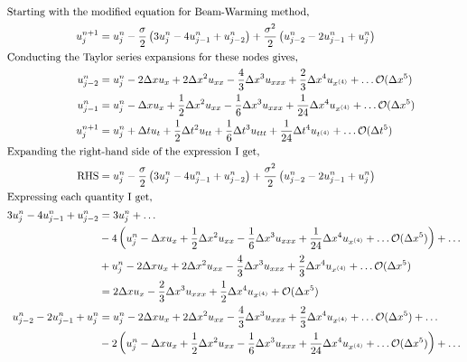 \begin{enumerate}[label=\alph*., start = 1]
    \vspace{-0.35in}
    \begin{align*}
        \shortintertext{Starting with the modified equation for Beam-Warming method,}
        u_j^{n+1} & = u_j^n - \frac{\sigma}{2}\left(3u_j^n - 4u_{j-1}^n + u_{j-2}^n\right) + \frac{\sigma^2}{2}\left(u_{j-2}^n - 2u_{j-1}^n + u_j^n\right)\\
        \shortintertext{Conducting the Taylor series expansions for these nodes gives,}
        u_{j-2}^n & = u_j^n - 2\Delta xu_x + 2\Delta x^2 u_{xx} - \frac{4}{3}\Delta x^3u_{xxx} + \frac{2}{3}\Delta x^4u_{x^{(4)}} + \ldots \mathcal{O}(\Delta x^5)\\
        u_{j-1}^n & = u_j^n - \Delta x u_x + \frac{1}{2}\Delta x^2 u_{xx} - \frac{1}{6}\Delta x^3 u_{xxx} + \frac{1}{24}\Delta x^4 u_{x^{(4)}} + \ldots \mathcal{O}(\Delta x^5)\\
        u_{j}^{n+1} & = u_j^n + \Delta tu_t + \frac{1}{2}\Delta t^2u_{tt} + \frac{1}{6}\Delta t^3 u_{ttt} + \frac{1}{24}\Delta t^4u_{t^{(4)}} + \ldots \mathcal{O}(\Delta t^5)\\
        \shortintertext{Expanding the right-hand side of the expression I get,}
        \text{RHS} & = u_j^n - \frac{\sigma}{2}\left(3u_j^n - 4u_{j-1}^n + u_{j-2}^n\right) + \frac{\sigma^2}{2}\left(u_{j-2}^n - 2u_{j-1}^n + u_j^n\right)\\
        \shortintertext{Expressing each quantity I get,}
        3u_j^n - 4u_{j-1}^n + u_{j-2}^n & = 3u_j^n + \ldots\\
        & - 4\left(u_j^n - \Delta x u_x + \frac{1}{2}\Delta x^2 u_{xx} - \frac{1}{6}\Delta x^3 u_{xxx} + \frac{1}{24}\Delta x^4 u_{x^{(4)}} + \ldots \mathcal{O}(\Delta x^5)\right) + \ldots\\
        & + u_j^n - 2\Delta xu_x + 2\Delta x^2 u_{xx} - \frac{4}{3}\Delta x^3u_{xxx} + \frac{2}{3}\Delta x^4u_{x^{(4)}} + \ldots \mathcal{O}(\Delta x^5)\\
        & = 2\Delta xu_x - \frac{2}{3}\Delta x^3 u_{xxx} + \frac{1}{2}\Delta x^4u_{x^{(4)}} + \mathcal{O}(\Delta x^5)\\
        u_{j-2}^n - 2u_{j-1}^n + u_j^n & = u_j^n - 2\Delta xu_x + 2\Delta x^2 u_{xx} - \frac{4}{3}\Delta x^3u_{xxx} + \frac{2}{3}\Delta x^4u_{x^{(4)}} + \ldots \mathcal{O}(\Delta x^5) + \ldots \\
        & -2\left(u_j^n - \Delta x u_x + \frac{1}{2}\Delta x^2 u_{xx} - \frac{1}{6}\Delta x^3 u_{xxx} + \frac{1}{24}\Delta x^4 u_{x^{(4)}} + \ldots \mathcal{O}(\Delta x^5)\right) + \ldots \\

\end{align*}
\end{enumerate}
